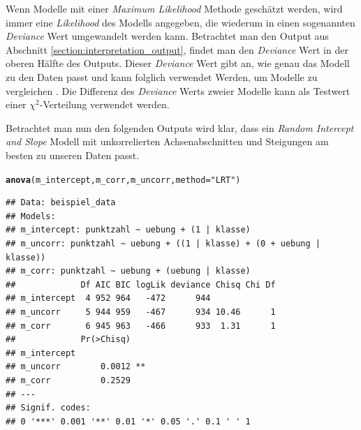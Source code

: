 \documentclass[12pt]{article}\usepackage[]{graphicx}\usepackage[]{color}
\makeatletter
\newcommand{\hlstr}[1]{\textcolor[rgb]{0.192,0.494,0.8}{#1}}%
\newcommand{\hlstd}[1]{\textcolor[rgb]{0.345,0.345,0.345}{#1}}%
\newcommand{\hlkwc}[1]{\textcolor[rgb]{0.333,0.667,0.333}{#1}}%
\newcommand{\hlkwd}[1]{\textcolor[rgb]{0.737,0.353,0.396}{\textbf{#1}}}%
\newenvironment{kframe}{%
 \def\at@end@of@kframe{}%
 \ifinner\ifhmode%
  \def\at@end@of@kframe{\end{minipage}}%
  \begin{minipage}{\columnwidth}%
 \fi\fi%
 \def\FrameCommand##1{\hskip\@totalleftmargin \hskip-\fboxsep
 \colorbox{shadecolor}{##1}\hskip-\fboxsep
     \hskip-\linewidth \hskip-\@totalleftmargin \hskip\columnwidth}%
 \MakeFramed {\advance\hsize-\width
   \@totalleftmargin\z@ \linewidth\hsize
   \@setminipage}}%
 {\par\unskip\endMakeFramed%
 \at@end@of@kframe}
\newenvironment{knitrout}{}{} %
\makeatother
\begin{document}
Wenn Modelle mit einer \textit{Maximum Likelihood} Methode geschätzt werden, wird immer eine \textit{Likelihood} des Modells angegeben, die wiederum in einen sogenannten \textit{Deviance} Wert umgewandelt werden kann. Betrachtet man den Output aus Abschnitt \ref{section:interpretation_output}, findet man den \textit{Deviance} Wert in der oberen Hälfte des Outputs. Dieser \textit{Deviance} Wert gibt an, wie genau das Modell zu den Daten passt und kann folglich verwendet Werden, um Modelle zu vergleichen \citep{SnijdersTomA.B2012Ma:a}. Die Differenz des \textit{Deviance} Werts zweier Modelle kann als Testwert einer $\chi^2$-Verteilung verwendet werden. 

Betrachtet man nun den folgenden Outputs wird klar, dass ein \textit{Random Intercept and Slope} Modell mit unkorrelierten Achsenabschnitten und Steigungen am besten zu unseren Daten passt. 

\singlespacing
\begin{knitrout}
\color{fgcolor}\begin{kframe}
\begin{alltt}
\hlkwd{anova}\hlstd{(m_intercept, m_corr, m_uncorr,} \hlkwc{method} \hlstd{=} \hlstr{"LRT"}\hlstd{)}
\end{alltt}
\begin{verbatim}
## Data: beispiel_data
## Models:
## m_intercept: punktzahl ~ uebung + (1 | klasse)
## m_uncorr: punktzahl ~ uebung + ((1 | klasse) + (0 + uebung | klasse))
## m_corr: punktzahl ~ uebung + (uebung | klasse)
##             Df AIC BIC logLik deviance Chisq Chi Df
## m_intercept  4 952 964   -472      944             
## m_uncorr     5 944 959   -467      934 10.46      1
## m_corr       6 945 963   -466      933  1.31      1
##             Pr(>Chisq)   
## m_intercept              
## m_uncorr        0.0012 **
## m_corr          0.2529   
## ---
## Signif. codes:  
## 0 '***' 0.001 '**' 0.01 '*' 0.05 '.' 0.1 ' ' 1
\end{verbatim}
\end{kframe}
\end{knitrout}
\end{document}
